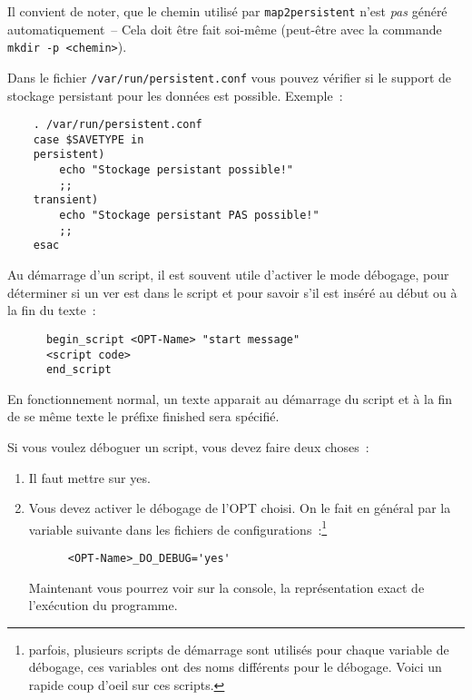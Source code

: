 Il convient de noter, que le chemin utilisé par \texttt{map2persistent} n'est \emph{pas}
généré automatiquement~-- Cela doit être fait soi-même (peut-être avec la commande
\texttt{mkdir -p <chemin>}).

Dans le fichier \texttt{/var/run/persistent.conf} vous pouvez vérifier si le support de
stockage persistant pour les données est possible. Exemple~:

\begin{example}
\begin{verbatim}
    . /var/run/persistent.conf
    case $SAVETYPE in
    persistent)
        echo "Stockage persistant possible!"
        ;;
    transient)
        echo "Stockage persistant PAS possible!"
        ;;
    esac
\end{verbatim}
\end{example}



    Au démarrage d'un script, il est souvent utile d’activer le mode débogage,
    pour déterminer si \og{}un ver est dans le script\fg{} et pour savoir s'il est inséré
    au début ou à la fin du texte~:

\begin{example}
\begin{verbatim}
      begin_script <OPT-Name> "start message"
      <script code>
      end_script
\end{verbatim}
\end{example}

En fonctionnement normal, un texte apparait au démarrage du script et à la fin
de se même texte le préfixe \og{}finished\fg{} sera spécifié.

Si vous voulez déboguer un script, vous devez faire deux choses~:

\begin{enumerate}
\item Il faut mettre  sur \og{}yes\fg{}.
\item Vous devez activer le débogage de l'OPT choisi. On le fait en général
   par la variable suivante dans les fichiers de configurations~:\footnote{parfois,
   plusieurs scripts de démarrage sont utilisés pour chaque variable de débogage,
   ces variables ont des noms différents pour le débogage. Voici un rapide coup d'oeil
   sur ces scripts.}
\begin{example}
\begin{verbatim}
      <OPT-Name>_DO_DEBUG='yes'
\end{verbatim}
\end{example}

Maintenant vous pourrez voir sur la console, la représentation exact de l'exécution
du programme.
\end{enumerate}


